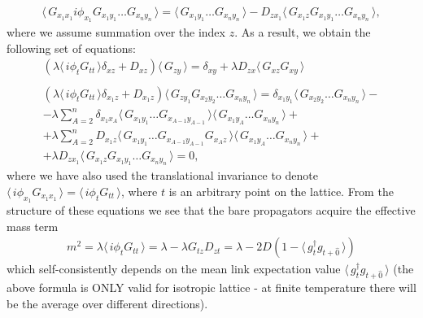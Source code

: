 \documentclass[twocolumn,showpacs,preprintnumbers,superscriptaddress,amsmath,floatfix,amssymb,secnumarabic]{revtex4}
\newcommand{\lr}[1]{ \left( #1 \right) }
\newcommand{\vev}[1]{ \langle \, #1 \, \rangle }
\begin{document}
\begin{widetext}
\begin{eqnarray}
 \vev{G_{x_1 x_1} i \phi_{x_1} G_{x_1 y_1} \ldots G_{x_n y_n}} = \vev{G_{x_1 y_1} \ldots G_{x_n y_n}} - D_{z x_1} \vev{G_{x_1 z} G_{x_1 y_1} \ldots G_{x_n y_n}} ,
\end{eqnarray}
where we assume summation over the index $z$. As a result, we obtain the following set of equations:
\begin{eqnarray}
\label{sd_G_general_lowest}
 \lr{\lambda \vev{i \phi_t G_{tt}} \delta_{x z} + D_{x z}} \vev{G_{z y}}
 = \delta_{x y} + \lambda D_{z x} \vev{G_{x z} G_{x y}}
 \\{}\nonumber\\
 \label{sd_G_general}
 \lr{\lambda \vev{i \phi_t G_{tt}} \delta_{x_1 z} + D_{x_1 z}} \vev{G_{z y_1} G_{x_2 y_2} \ldots G_{x_n y_n}}
 = \delta_{x_1 y_1} \vev{G_{x_2 y_2} \ldots G_{x_n y_n}}
 - \nonumber \\ -
 \lambda \sum\limits_{A=2}^{n} \delta_{x_1 x_A} \vev{G_{x_1 y_1} \ldots G_{x_{A-1} y_{A-1}}} \vev{G_{x_1 y_A} \ldots G_{x_n y_n}}
 + \nonumber \\ +
 \lambda \sum\limits_{A=2}^{n} D_{x_1 z} \vev{G_{x_1 y_1} \ldots G_{x_{A-1} y_{A-1}} G_{x_A z}} \vev{G_{x_1 y_A} \ldots G_{x_n y_n}}
 + \nonumber \\ +
 \lambda D_{z x_1} \vev{G_{x_1 z} G_{x_1 y_1} \ldots G_{x_n y_n}} = 0 ,
\end{eqnarray}
where we have also used the translational invariance to denote $\vev{i \phi_{x_1} G_{x_1 x_1}} = \vev{i \phi_t G_{tt}}$, where $t$ is an arbitrary point on the lattice. From the structure of these equations we see that the bare propagators acquire the effective mass term
\begin{eqnarray}
\label{eff_mass_lm}
 m^2 = \lambda \vev{i \phi_t G_{tt}} = \lambda - \lambda G_{t z} D_{z t}
 = \lambda - 2 D \lr{1 - \vev{g^{\dag}_t g_{t + \hat{0}}} }
\end{eqnarray}
which self-consistently depends on the mean link expectation value $\vev{g^{\dag}_t g_{t + \hat{0}}}$ (the above formula is ONLY valid for isotropic lattice - at finite temperature there will be the average over different directions).


\end{widetext}
\end{document}
